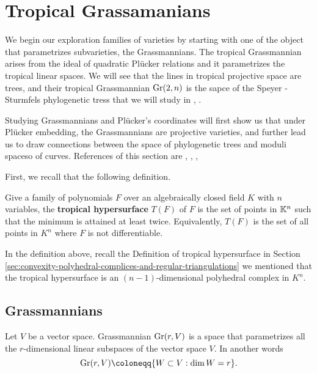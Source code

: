 \section{Tropical Grassamanians}
\label{sec:tropical-grassmannians}
    We begin our exploration families of varieties by starting with one of the object that parametrizes subvarieties, the Grassmannians.
    The tropical Grassmannian arises from the ideal of quadratic Pl\"{u}cker relations 
    and it parametrizes the tropical linear spaces.  
    We will see that the lines in tropical projective space are trees, 
    and their tropical Grassmannian $\operatorname{Gr}(2, n)$ is the sapce of the Speyer -Sturmfels phylogenetic tress that we will study in \citet{Billera2002},
    \citet{Speyer2004}. 
    
    Studying Grassmannians and Pl\"{u}cker's coordinates will first show us that
    under Pl\"{u}cker embedding, the Grassmannians are projective varieties,
    and further lead us to draw connections between the space of phylogenetic trees and moduli spaceso of curves. 
    References of this section are \citet{Maclagan2015}, 
    \citet{Speyer2003}, 
    \citet{Ranganathan2010},
    \citet{Hudec2007}
    
    
    First, we recall that the following definition.
    \begin{definition}
    \label{def:tropical-hypersurface}
        Give a family of polynomials $F$ over an algebraically closed field $K$ with $n$ variables,
        the \textbf{tropical hypersurface} $T(F)$ of $F$ is the set of points in $\mathbb{K}^n$ such that the minimum is attained at least twice. 
        Equivalently, 
        $T(F)$ is the set of all points in $K^n$ where $F$ is not differentiable. 
    \end{definition}
    In the definition above, recall the Definition of tropical hypersurface in Section \ref{sec:convexity-polyhedral-complices-and-regular-triangulations}
    we mentioned that the tropical hypersurface is an $(n - 1)$-dimensional polyhedral complex in $K^n$. 
    
    \subsection{Grassmannians}
    \label{subsec:grassmannians}     
        \begin{definition}[Grassmannians]
        \label{def:grassmannians}
            Let $V$ be a vector space. 
            Grassmannian $\operatorname{Gr}(r, V)$ is a space
            that parametrizes all the $r$-dimensional linear subspaces of the vector space $V$. 
            In another words 
            \[
            \gr(r, V) \coloneqq \{W \subset V: \dim W = r\}.
            \]
        \end{definition}
        
